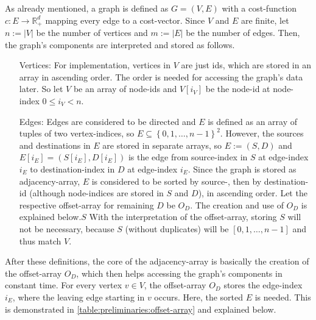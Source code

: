     As already mentioned, a graph is defined as $G = (V, E)$ with a cost-function $c: E \to \mathbb{R}_+^d$ mapping every edge to a cost-vector.
    Since $V$ and $E$ are finite, let $n := \left| V \right|$ be the number of vertices and $m := \left| E \right|$ be the number of edges.
    Then, the graph's components are interpreted and stored as follows.
    \begin{itemize}
        \item[Vertices:]
            For implementation, vertices in $V$ are just ids, which are stored in an array in ascending order.
            The order is needed for accessing the graph's data later.
            So let $V$ be an array of node-ids and $V[i_V]$ be the node-id at node-index $0 \le i_V < n$.
        \item[Edges:]
            Edges are considered to be directed and $E$ is defined as an array of tuples of two vertex-indices, so $E \subseteq \left\{ 0, 1, \dots, n-1 \right\}^2$.
            However, the sources and destinations in $E$ are stored in separate arrays, so $E := (S, D)$ and $E[i_E] = (S[i_E], D[i_E])$ is the edge from source-index in $S$ at edge-index $i_E$ to destination-index in $D$ at edge-index $i_E$.
            Since the graph is stored as adjacency-array, $E$ is considered to be sorted by source-, then by destination-id (although node-indices are stored in $S$ and $D$), in ascending order.
            Let the respective offset-array for remaining $D$ be $O_D$.
            The creation and use of $O_D$ is explained below.$S$
            With the interpretation of the offset-array, storing $S$ will not be necessary, because $S$ (without duplicates) will be $[0, 1, \dots, n-1]$ and thus match $V$.
    \end{itemize}

    After these definitions, the core of the adjacency-array is basically the creation of the offset-array $O_D$, which then helps accessing the graph's components in constant time.
    For every vertex $v \in V$, the offset-array $O_D$ stores the edge-index $i_E$, where the leaving edge starting in $v$ occurs.
    Here, the sorted $E$ is needed.
    This is demonstrated in \cref{table:preliminaries:offset-array} and explained below.

